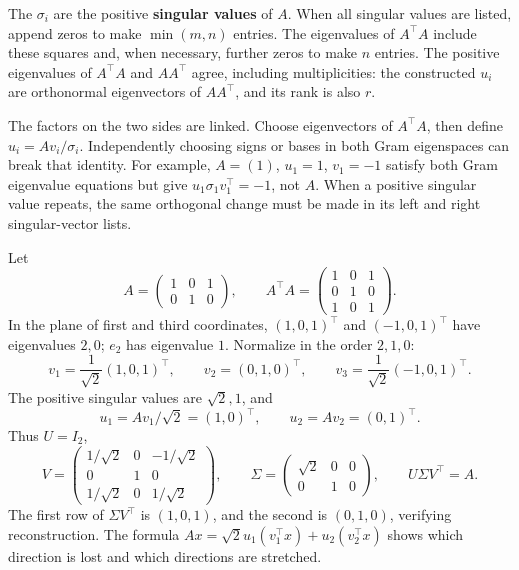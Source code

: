 The \(\sigma_i\) are the positive \textbf{singular values} of \(A\).
When all singular values are listed, append zeros to make
\(\min(m,n)\) entries. The eigenvalues of \(A^\top A\) include these
squares and, when necessary, further zeros to make \(n\) entries.
The positive eigenvalues of \(A^\top A\) and \(AA^\top\) agree, including
multiplicities: the constructed \(u_i\) are orthonormal eigenvectors of
\(AA^\top\), and its rank is also \(r\).

The factors on the two sides are linked. Choose eigenvectors of
\(A^\top A\), then define \(u_i=Av_i/\sigma_i\). Independently choosing
signs or bases in both Gram eigenspaces can break that identity.
For example, \(A=(1)\), \(u_1=1\), \(v_1=-1\) satisfy both Gram
eigenvalue equations but give \(u_1\sigma_1v_1^\top=-1\), not \(A\).
When a positive singular value repeats, the same orthogonal change must
be made in its left and right singular-vector lists.

\begin{example}\label{eg:10:rectangular}
Let
\[
A=\begin{pmatrix}1&0&1\\0&1&0\end{pmatrix},\qquad
A^\top A=\begin{pmatrix}1&0&1\\0&1&0\\1&0&1\end{pmatrix}.
\]
In the plane of first and third coordinates, \((1,0,1)^\top\) and
\((-1,0,1)^\top\) have eigenvalues \(2,0\); \(e_2\) has eigenvalue \(1\).
Normalize in the order \(2,1,0\):
\[
v_1=\frac1{\sqrt2}(1,0,1)^\top,\qquad
v_2=(0,1,0)^\top,\qquad
v_3=\frac1{\sqrt2}(-1,0,1)^\top.
\]
The positive singular values are \(\sqrt2,1\), and
\[
u_1=Av_1/\sqrt2=(1,0)^\top,\qquad
u_2=Av_2=(0,1)^\top.
\]
Thus \(U=I_2\),
\[
V=\begin{pmatrix}1/\sqrt2&0&-1/\sqrt2\\0&1&0\\1/\sqrt2&0&1/\sqrt2\end{pmatrix},
\qquad \Sigma=\begin{pmatrix}\sqrt2&0&0\\0&1&0\end{pmatrix},
\qquad U\Sigma V^\top=A.
\]
The first row of \(\Sigma V^\top\) is \((1,0,1)\), and the second is
\((0,1,0)\), verifying reconstruction. The formula
\(Ax=\sqrt2u_1(v_1^\top x)+u_2(v_2^\top x)\)
shows which direction is lost and which directions are stretched.
\end{example}

